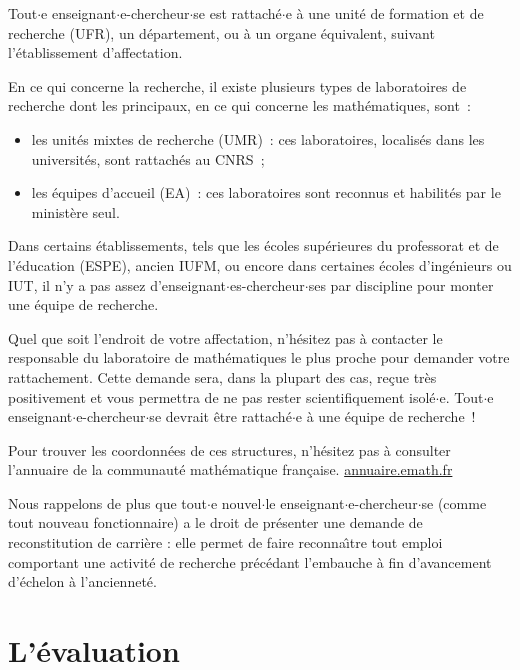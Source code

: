 Tout$\cdot$e enseignant$\cdot$e-chercheur$\cdot$se est rattach\'e$\cdot$e \`a une unit\'e de formation
et de recherche (UFR), un d\'epar\-te\-ment, ou \`a un organe
\'equivalent, suivant l'\'etablissement d'affectation.

En ce qui concerne la recherche, il existe plusieurs types de
laboratoires de recherche dont les principaux, en ce qui concerne
les math\'ematiques, sont~:
\begin{itemize}
	\item les unit\'es mixtes de recherche (UMR)~: ces laboratoires,
		localis\'es dans les universit\'es, sont rattach\'es au CNRS~;
	\item les \'equipes d'accueil (EA)~: ces laboratoires sont
		reconnus et habilit\'es par le minist\`ere seul.
\end{itemize}

Dans certains \'etablissements, tels que 
les \'ecoles supérieures du professorat et de l'\'education (ESPE), ancien IUFM,
ou encore dans
certaines \'ecoles d'ing\'enieurs ou IUT, il n'y a pas assez
d'enseignant$\cdot$es-chercheur$\cdot$ses par discipline pour monter une \'equipe de
recherche.

Quel que soit l'endroit de votre affectation, n'h\'esitez pas
\`a contacter le responsable du laboratoire de math\'e\-matiques le plus
proche pour demander votre rattachement. Cette demande sera, dans la
plupart des cas, re\c cue tr\`es positivement et vous permettra de ne
pas rester scientifiquement isol\'e$\cdot$e. Tout$\cdot$e enseignant$\cdot$e-chercheur$\cdot$se
devrait \^etre rattach\'e$\cdot$e \`a une \'equipe de
recherche~!

Pour trouver les coordonn\'ees de ces structures, n'h\'esitez pas \`a
consulter l'annuaire de la communaut\'e math\'e\-matique
fran\c caise. \url{annuaire.emath.fr}

Nous rappelons de plus que tout$\cdot$e nouvel$\cdot$le enseignant$\cdot$e-chercheur$\cdot$se (comme tout nouveau fonctionnaire)
a le droit de pr\'esenter une demande de reconstitution de carri\`ere : elle permet de faire reconna\^\i tre tout emploi comportant une activit\'e de recherche pr\'ec\'edant l'embauche \`a fin d'avancement d'\'echelon \`a l'anciennet\'e.

\section{L'\'evaluation}

